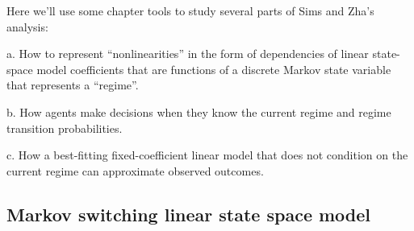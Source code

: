 \noindent Here we'll use some  chapter  tools to  study   several   parts of Sims and Zha's analysis:

\medskip
\item{a.} How to represent ``nonlinearities'' in the form of dependencies of linear state-space model 
coefficients that are functions of  a discrete  Markov state variable that
represents a ``regime''.

\medskip
\item{b.} How agents make decisions when they  know   the current regime and regime transition probabilities.

\medskip
\item{c.} How   a best-fitting fixed-coefficient linear model that does not condition on the current regime can  approximate observed 
outcomes.


\medskip

\subsection{Markov switching linear state space model}

